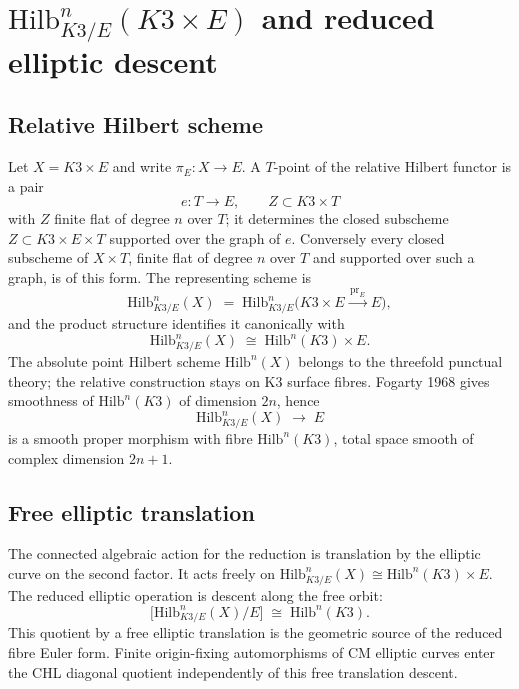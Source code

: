 \providecommand{\Hilb}{\mathrm{Hilb}}
\providecommand{\ch}{\mathrm{ch}}
\providecommand{\cat}{\mathrm{cat}}
\providecommand{\BKM}{\mathrm{BKM}}
\providecommand{\DT}{\mathrm{DT}}
\providecommand{\Eone}{E_1}
\providecommand{\Etwo}{E_2}
\providecommand{\cO}{\mathcal O}
\providecommand{\cZ}{\mathcal Z}
\providecommand{\Rep}{\mathrm{Rep}}
\providecommand{\kch}{\kappa_{\ch}}
\providecommand{\kcat}{\kappa_{\cat}}
\providecommand{\kBKM}{\kappa_{\BKM}}
\providecommand{\kfib}{\kappa_{\mathrm{fiber}}}
\providecommand{\CoHA}{\mathrm{CoHA}}
\providecommand{\PhiOP}{\Phi_{10}^{\mathrm{OP}}}
\providecommand{\Dfive}{D_5}
\providecommand{\Deltafive}{\Delta_5}

\section*{$\Hilb^{n}_{K3/E}(K3\times E)$ and reduced elliptic descent}

\subsection*{Relative Hilbert scheme}

Let \(X=K3\times E\) and write \(\pi_E:X\to E\).  A \(T\)-point of the
relative Hilbert functor is a pair
\[
  e:T\to E,\qquad
  Z\subset K3\times T
\]
with \(Z\) finite flat of degree \(n\) over \(T\); it determines the
closed subscheme \(Z\subset K3\times E\times T\) supported over the graph
of \(e\).  Conversely every closed subscheme of \(X\times T\), finite
flat of degree \(n\) over \(T\) and supported over such a graph, is of
this form.  The representing scheme is
\[
  \Hilb^{n}_{K3/E}(X) \;=\;
  \Hilb^{n}_{K3/E}\bigl(K3\times E \xrightarrow{\,\mathrm{pr}_{E}\,} E\bigr),
\]
and the product structure identifies it canonically with
\[
  \Hilb^{n}_{K3/E}(X) \;\cong\; \Hilb^{n}(K3)\times E .
\]
The absolute point Hilbert scheme \(\Hilb^n(X)\) belongs to the
threefold punctual theory; the relative construction stays on K3
surface fibres.  Fogarty 1968 gives smoothness of \(\Hilb^{n}(K3)\)
of dimension \(2n\), hence
\[
  \Hilb^{n}_{K3/E}(X) \;\longrightarrow\; E
\]
is a smooth proper morphism with fibre \(\Hilb^{n}(K3)\), total space
smooth of complex dimension \(2n+1\).

\subsection*{Free elliptic translation}

The connected algebraic action for the reduction is translation by
the elliptic curve on the second factor.  It acts freely on
\(\Hilb^{n}_{K3/E}(X)\cong\Hilb^{n}(K3)\times E\).  The reduced
elliptic operation is descent along the free orbit:
\[
  \bigl[\Hilb^{n}_{K3/E}(X)/E\bigr]
  \;\cong\;
  \Hilb^{n}(K3).
\]
This quotient by a free elliptic translation is the geometric source of
the reduced fibre Euler form.  Finite origin-fixing automorphisms of
CM elliptic curves enter the CHL diagonal quotient independently of
this free translation descent.

